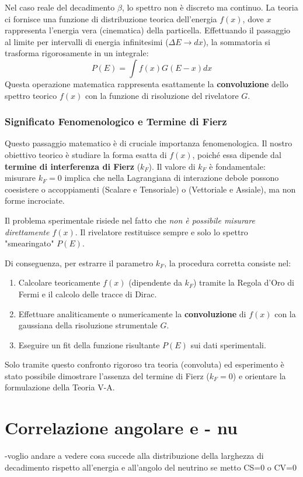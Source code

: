 Nel caso reale del decadimento $\beta$, lo spettro non è discreto ma continuo. La teoria ci fornisce una funzione di distribuzione teorica dell'energia $f(x)$, dove $x$ rappresenta l'energia vera (cinematica) della particella. Effettuando il passaggio al limite per intervalli di energia infinitesimi ($\Delta E \to dx$), la sommatoria si trasforma rigorosamente in un integrale:
\begin{equation}
	P(E) = \int f(x) G(E - x) dx
\end{equation}
Questa operazione matematica rappresenta esattamente la \textbf{convoluzione} dello spettro teorico $f(x)$ con la funzione di risoluzione del rivelatore $G$.

\subsubsection*{Significato Fenomenologico e Termine di Fierz}
Questo passaggio matematico è di cruciale importanza fenomenologica. Il nostro obiettivo teorico è studiare la forma esatta di $f(x)$, poiché essa dipende dal \textbf{termine di interferenza di Fierz} ($k_F$). Il valore di $k_F$ è fondamentale: misurare $k_F = 0$ implica che nella Lagrangiana di interazione debole possono coesistere o accoppiamenti (Scalare e Tensoriale) o (Vettoriale e Assiale), ma non forme incrociate.

Il problema sperimentale risiede nel fatto che \textit{non è possibile misurare direttamente $f(x)$}. Il rivelatore restituisce sempre e solo lo spettro "smearingato" $P(E)$. 

Di conseguenza, per estrarre il parametro $k_F$, la procedura corretta consiste nel:
\begin{enumerate}
	\item Calcolare teoricamente $f(x)$ (dipendente da $k_F$) tramite la Regola d'Oro di Fermi e il calcolo delle tracce di Dirac.
	\item Effettuare analiticamente o numericamente la \textbf{convoluzione} di $f(x)$ con la gaussiana della risoluzione strumentale $G$.
	\item Eseguire un fit della funzione risultante $P(E)$ sui dati sperimentali.
\end{enumerate}
Solo tramite questo confronto rigoroso tra teoria (convoluta) ed esperimento è stato possibile dimostrare l'assenza del termine di Fierz ($k_F = 0$) e orientare la formulazione della Teoria V-A.

\section{Correlazione angolare e - nu}
-voglio andare a vedere cosa succede alla distribuzione della larghezza di decadimento rispetto all'energia e all'angolo del neutrino se metto CS=0 o CV=0

